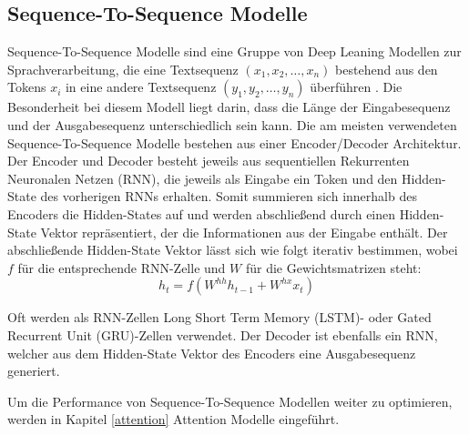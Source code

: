 \subsection{Sequence-To-Sequence Modelle}
Sequence-To-Sequence Modelle sind eine Gruppe von Deep Leaning Modellen zur Sprachverarbeitung, die eine Textsequenz $(x_1,x_2,\ldots,x_n)$ bestehend aus den Tokens $x_i$ in eine andere Textsequenz $(y_1,y_2,\ldots,y_n)$ überführen \citep{DBLP:journals/corr/SutskeverVL14}.
Die Besonderheit bei diesem Modell liegt darin, dass die Länge der Eingabesequenz und der Ausgabesequenz unterschiedlich sein kann.
Die am meisten verwendeten Sequence-To-Sequence Modelle bestehen aus einer Encoder/Decoder Architektur.
Der Encoder und Decoder besteht jeweils aus sequentiellen Rekurrenten Neuronalen Netzen (RNN), die jeweils als Eingabe ein Token und den Hidden-State des vorherigen RNNs erhalten.
Somit summieren sich innerhalb des Encoders die Hidden-States auf und werden abschließend durch einen Hidden-State Vektor repräsentiert, der die Informationen aus der Eingabe enthält.
Der abschließende Hidden-State Vektor lässt sich wie folgt iterativ bestimmen, wobei $f$ für die entsprechende RNN-Zelle und $W$ für die Gewichtsmatrizen steht:
\begin{equation}
    h_t = f(W^{hh}h_{t-1}+W^{hx}x_t)
\end{equation}

Oft werden als RNN-Zellen Long Short Term Memory (LSTM)- oder Gated Recurrent Unit (GRU)-Zellen verwendet.
Der Decoder ist ebenfalls ein RNN, welcher aus dem Hidden-State Vektor des Encoders eine Ausgabesequenz generiert.

Um die Performance von Sequence-To-Sequence Modellen weiter zu optimieren, werden in Kapitel \ref{attention} Attention Modelle eingeführt.



